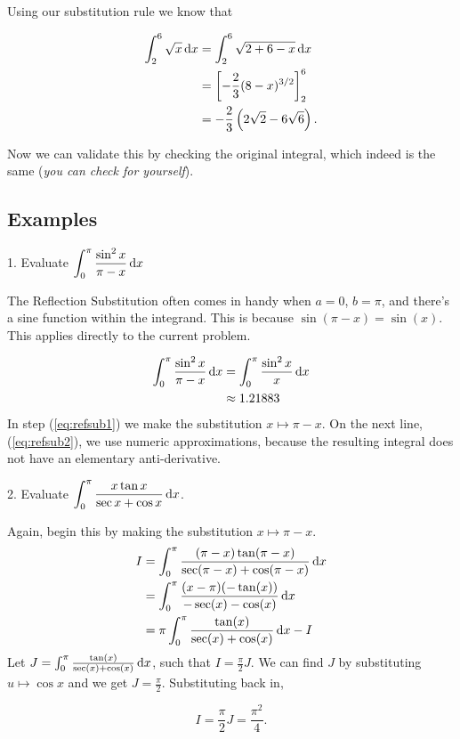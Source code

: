 \noindent Using our substitution rule we know that 

\begin{align*}
    \int_2^6 \sqrt{x}\,\textrm{d}x &= \int_2^6 \sqrt{2+6-x}\,\textrm{d}x \\
    &= \left[ -\frac 2 3 (8-x)^{3/2} \right]_2^6 \\
    &= -\frac{2}{3} \left( 2\sqrt2-6\sqrt6 \right). 
\end{align*}

Now we can validate this by checking the original integral, which indeed is the same (\textit{you can check for yourself}).

\subsection*{Examples}

1. Evaluate $\displaystyle \int_0^\pi \frac{\sin^2x}{\pi-x}\,\textrm{d}x$

\begin{ExampleBody}
    The Reflection Substitution often comes in handy when $a=0$, $b=\pi$, and there's a sine function within the integrand. This is because $\sin(\pi-x) = \sin(x)$. This applies directly to the current problem.
    
    \begin{align}
        \int_0^\pi \frac{\sin^2 x}{\pi-x}\,\textrm{d}x &= \int_0^\pi \frac{\sin^2 x}{x}\,\textrm{d}x \label{eq:refsub1}\\
        &\approx 1.21883 \label{eq:refsub2}
    \end{align}
    In step (\ref{eq:refsub1}) we make the substitution $x\mapsto\pi-x$. On the next line, (\ref{eq:refsub2}), we use numeric approximations, because the resulting integral does not have an elementary anti-derivative.
\end{ExampleBody}

2. Evaluate $\displaystyle \int_0^\pi \frac{x\tan x}{\sec x + \cos x}\,\textrm{d}x$.

\begin{ExampleBody}
    Again, begin this by making the substitution $x\mapsto\pi-x$.
    \begin{align*}
        I &=\int_0^\pi     \frac{(\pi-x)\tan(\pi-x)}{\sec(\pi-x)+\cos(\pi-x)}\,\textrm{d}x\\ 
        &=\int_0^\pi     \frac{(x-\pi)(-\tan(x))}{-\sec(x)-\cos(x)}\,\textrm{d}x\\ 
        &= \pi\int_0^\pi\frac{\tan(x)}{\sec(x)+\cos(x)}\,\textrm{d}x-I
    \end{align*}
    Let $J = \int_0^\pi \frac{\tan(x)}{\sec(x)+\cos(x)}\,\textrm{d}x$, such that $I = \frac{\pi}{2} J$. We can find $J$ by substituting $u\mapsto\cos x$ and we get $J=\frac{\pi}{2}$. Substituting back in,
    
    $$ I = \frac{\pi}{2} J = \frac{\pi^2}{4} .$$
    
\end{ExampleBody}


